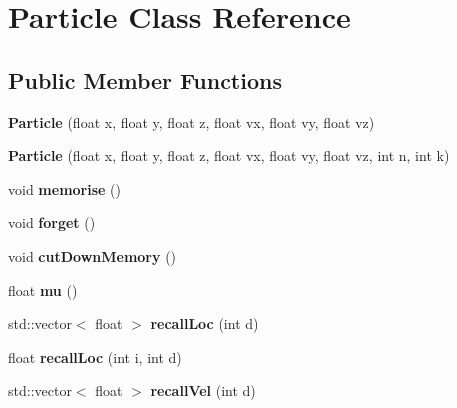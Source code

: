 \hypertarget{classParticle}{\section{Particle Class Reference}
\label{classParticle}
}
\subsection*{Public Member Functions}
\begin{DoxyCompactItemize}
\item 
\hypertarget{classParticle_a49f144ca7fdbc69a4a15807da34a4de7}{{\bfseries Particle} (float x, float y, float z, float vx, float vy, float vz)}\label{classParticle_a49f144ca7fdbc69a4a15807da34a4de7}

\item 
\hypertarget{classParticle_a68349fa4526daeed2e2047cccc89fd43}{{\bfseries Particle} (float x, float y, float z, float vx, float vy, float vz, int n, int k)}\label{classParticle_a68349fa4526daeed2e2047cccc89fd43}

\item 
\hypertarget{classParticle_a8971d5a6e47645f45e315f88bc4f5177}{void {\bfseries memorise} ()}\label{classParticle_a8971d5a6e47645f45e315f88bc4f5177}

\item 
\hypertarget{classParticle_a967cb59ea718d98f258d9357c33c5350}{void {\bfseries forget} ()}\label{classParticle_a967cb59ea718d98f258d9357c33c5350}

\item 
\hypertarget{classParticle_a838c883ed854b36a7cbd8957099d6525}{void {\bfseries cut\+Down\+Memory} ()}\label{classParticle_a838c883ed854b36a7cbd8957099d6525}

\item 
\hypertarget{classParticle_a393162f815de163a946841bbd536ee3d}{float {\bfseries mu} ()}\label{classParticle_a393162f815de163a946841bbd536ee3d}

\item 
\hypertarget{classParticle_a0252dcbaa02b6a9a189737a96f7c4b9a}{std\+::vector$<$ float $>$ {\bfseries recall\+Loc} (int d)}\label{classParticle_a0252dcbaa02b6a9a189737a96f7c4b9a}

\item 
\hypertarget{classParticle_aba5fab311338c581ed8c4bda20844e9f}{float {\bfseries recall\+Loc} (int i, int d)}\label{classParticle_aba5fab311338c581ed8c4bda20844e9f}

\item 
\hypertarget{classParticle_ad2bdf3d5009501e398cfcf5eb61065ec}{std\+::vector$<$ float $>$ {\bfseries recall\+Vel} (int d)}\label{classParticle_ad2bdf3d5009501e398cfcf5eb61065ec}


\end{DoxyCompactItemize}
